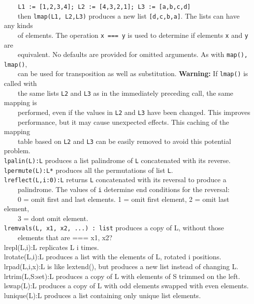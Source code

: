  \ \texttt{\ \ \ }\texttt{L1 := [1,2,3,4]; L2 := [4,3,2,1]; L3 :=
[{\textquotedbl}a{\textquotedbl},{\textquotedbl}b{\textquotedbl},{\textquotedbl}c{\textquotedbl},{\textquotedbl}d{\textquotedbl}]}\\
 \ \ \ \ then \texttt{lmap(L1, L2,L3)} produces a new list
\texttt{[{\textquotedbl}d{\textquotedbl},{\textquotedbl}c{\textquotedbl},{\textquotedbl}b{\textquotedbl},{\textquotedbl}a{\textquotedbl}]}.
The lists can have any kinds\\
 \ \ \ \ of elements. The operation \texttt{x === y} is used to
determine if elements \texttt{x} and \texttt{y} are\\
 \ \ \ \ equivalent. No defaults are provided for omitted arguments. As
with \texttt{map(), lmap()},\\
 \ \ \ \ can be used for transposition as well as substitution.
\textbf{Warning: }If \texttt{lmap()} is called with\\
 \ \ \ \ the same lists \texttt{L2} and \texttt{L3} as in the
immediately preceding call, the same mapping is\\
 \ \ \ \ performed, even if the values in \texttt{L2} and \texttt{L3}
have been changed. This improves\\
 \ \ \ \ performance, but it may cause unexpected effects. This
{\textquotedbl}caching{\textquotedbl} of the mapping\\
 \ \ \ \ table based on \texttt{L2} and \texttt{L3} can be easily
removed to avoid this potential problem.\\
\texttt{lpalin(L):L} produces a list palindrome of \texttt{L}
concatenated with its reverse.\\
\texttt{lpermute(L):L*} produces all the permutations of list
\texttt{L}.\\
\texttt{lreflect(L,i:0):L} returns \texttt{L} concatenated with its
reversal to produce a\\
 \ \ \ \ palindrome. The values of \texttt{i} determine
{\textquotedbl}end conditions{\textquotedbl} for the reversal:\\
 \ \ \ \ 0 = omit first and last elements. 1 = omit first element, 2 =
omit last element,\\
 \ \ \ \ 3 = don{\textquotesingle}t omit element.\\
\texttt{lremvals(L, x1, x2, ...) : list} produces a copy of L, without
those\\
 \ \ \ \ elements that are === x1, x2?\\
lrepl(L,i):L replicates L i
times.\\
lrotate(L,i):L produces a list with the elements of L, rotated i
positions.\\
lrpad(L,i,x):L is like lextend(), but produces a new list instead of
changing L.\\
lrtrim(L,S:set):L produces a copy of L with elements of S trimmed on the
left.\\
lswap(L):L produces a copy of L with odd elements swapped with even
elements.\\
lunique(L):L produces a list containing only unique list elements.

